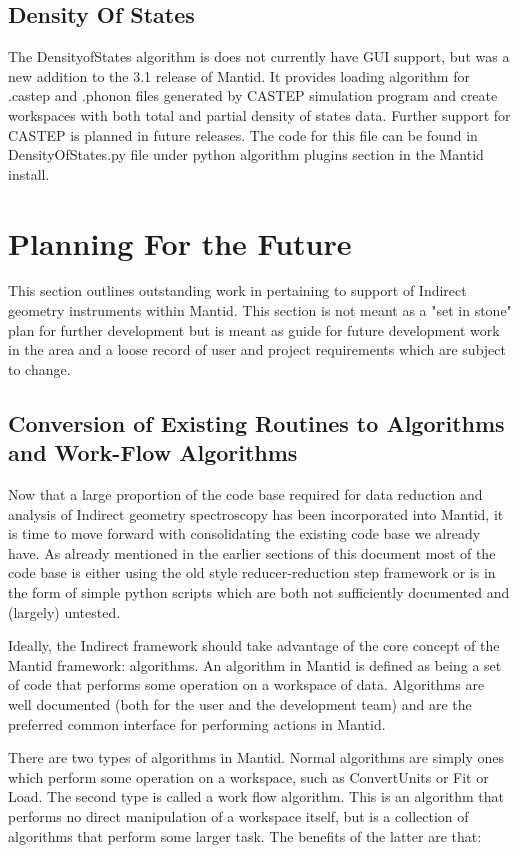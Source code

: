 \documentclass[paper=a4, fontsize=11pt]{scrartcl}	%
\numberwithin{equation}{section}															%
\numberwithin{figure}{section}																%
\numberwithin{table}{section}																%
\begin{document}
\subsection{Density Of States}
The DensityofStates algorithm is does not currently have GUI support, but was a new addition to the 3.1 release of Mantid. It provides loading algorithm for .castep and .phonon files generated by CASTEP simulation program and create workspaces with both total and partial density of states data. Further support for CASTEP is planned in future releases. The code for this file can be found in DensityOfStates.py file under python algorithm plugins section in the Mantid install.

\section{Planning For the Future}
This section outlines outstanding work in pertaining to support of Indirect geometry instruments within Mantid. This section is not meant as a "set in stone" plan for further development but is meant as guide for future development work in the area and a loose record of user and project requirements which are subject to change.

\subsection{Conversion of Existing Routines to Algorithms and Work-Flow Algorithms}
Now that a large proportion of the code base required for data reduction and analysis of Indirect geometry spectroscopy has been incorporated into Mantid, it is time to move forward with consolidating the existing code base we already have. As already mentioned in the earlier sections of this document most of the code base is either using the old style reducer-reduction step framework or is in the form of simple python scripts which are both not sufficiently documented and (largely) untested.

Ideally, the Indirect framework should take advantage of the core concept of the Mantid framework: algorithms. An algorithm in Mantid is defined as being a set of code that performs some operation on a workspace of data. Algorithms are well documented (both for the user and the development team) and are the preferred common interface for performing actions in Mantid.

There are two types of algorithms in Mantid. Normal algorithms are simply ones which perform some operation on a workspace, such as ConvertUnits or Fit or Load. The second type is called a work flow algorithm. This is an algorithm that performs no direct manipulation of a workspace itself, but is a collection of algorithms that perform some larger task. The benefits of the latter are that: 
\end{document}
